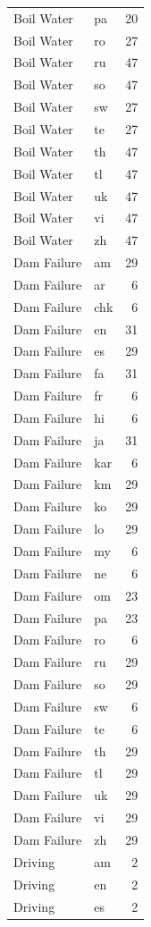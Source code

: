 \begin{longtable}{p{3cm} p{3cm} r}
Boil Water & pa & 20 \\
Boil Water & ro & 27 \\
Boil Water & ru & 47 \\
Boil Water & so & 47 \\
Boil Water & sw & 27 \\
Boil Water & te & 27 \\
Boil Water & th & 47 \\
Boil Water & tl & 47 \\
Boil Water & uk & 47 \\
Boil Water & vi & 47 \\
Boil Water & zh & 47 \\
Dam Failure & am & 29 \\
Dam Failure & ar & 6 \\
Dam Failure & chk & 6 \\
Dam Failure & en & 31 \\
Dam Failure & es & 29 \\
Dam Failure & fa & 31 \\
Dam Failure & fr & 6 \\
Dam Failure & hi & 6 \\
Dam Failure & ja & 31 \\
Dam Failure & kar & 6 \\
Dam Failure & km & 29 \\
Dam Failure & ko & 29 \\
Dam Failure & lo & 29 \\
Dam Failure & my & 6 \\
Dam Failure & ne & 6 \\
Dam Failure & om & 23 \\
Dam Failure & pa & 23 \\
Dam Failure & ro & 6 \\
Dam Failure & ru & 29 \\
Dam Failure & so & 29 \\
Dam Failure & sw & 6 \\
Dam Failure & te & 6 \\
Dam Failure & th & 29 \\
Dam Failure & tl & 29 \\
Dam Failure & uk & 29 \\
Dam Failure & vi & 29 \\
Dam Failure & zh & 29 \\
Driving & am & 2 \\
Driving & en & 2 \\
Driving & es & 2 \\

\end{longtable}
